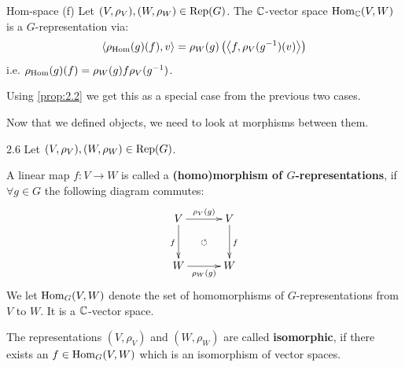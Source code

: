\documentclass[twoside = false,	%
		headsepline,		%
		parskip = true,
		]{scrbook}						%
\begin{document}
    \begin{definition*}
    {Hom-space (f)}
        Let $(V,\rho_V), (W,\rho_W) \in \mathrm{Rep}(G)$. The $\mathbb C$-vector space $\mathrm{Hom}_\mathbb C(V,W)$ is a $G$-representation via:
        \begin{equation*}
        \begin{split}
            \left\langle \rho_{\mathrm{Hom}}(g)(f),v\right\rangle = \rho_W(g)\left( \left\langle f,\rho_V(g^{-1})(v)\right\rangle\right)
        \end{split}
        \end{equation*}
        i.e. $\rho_{\mathrm{Hom}}(g)(f) = \rho_W(g) f \rho_V(g^{-1})$.
    \end{definition*}
    \begin{remark*}{}
        Using \ref{prop:2.2} we get this as a special case from the previous two cases.
    \end{remark*}
    
    Now that we defined objects, we need to look at morphisms between them.
    
    \begin{definition}{}{2.6}
        Let $(V,\rho_V), (W,\rho_W) \in \mathrm{Rep}(G)$.
        
        A linear map $f: V \to W$ is called a \textbf{(homo)morphism of $G$-representations}, if $\forall g \in G$ the following diagram commutes:
        \begin{equation*}
        \xymatrix @C=30pt @R=30pt{
            V \ar^{\rho_V(g)}[r] \ar_{f}[d] & V\ar^{f}[d] \\
            W \ar_{\rho_W(g)}[r] & W\ar@{}|{\circlearrowleft}[ul]
        }
        \end{equation*}
        We let $\mathrm{Hom}_G(V,W)$ denote the set of homomorphisms of $G$-representations from $V$ to $W$. It is a $\mathbb C$-vector space.
        
        The representations $(V,\rho_V)$ and $(W,\rho_W)$ are called \textbf{isomorphic}, if there exists an $f \in \mathrm{Hom}_G(V,W)$ which is an isomorphism of vector spaces.
    \end{definition}
    
\end{document}
